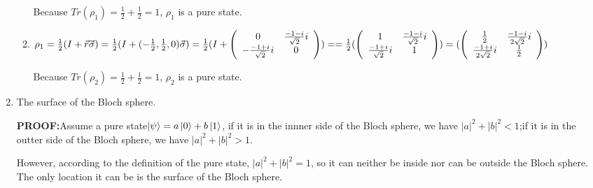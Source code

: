 \documentclass{article}
\begin{document}
\begin{enumerate}
\begin{enumerate}
                    Because $Tr(\rho_1)=\frac{1}{2}+\frac{1}{2}=1$, $\rho_1$ is a pure state.
              \item $\rho_1
                        \\=\frac{1}{2}(I+\vec{r}\vec{\sigma})
                        \\=\frac{1}{2}(I+(-\frac{1}{2},\frac{1}{2},0)\vec{\sigma})
                        \\=\frac{1}{2}(I+\left(
                        \begin{array}{cc}
                                0 & \frac{-1-i}{\sqrt{2}}i \\-\frac{-1+i}{\sqrt{2}}i&0\\
                            \end{array}
                        \right))
                        \\==\frac{1}{2}(\left(
                        \begin{array}{cc}
                                1 & \frac{-1-i}{\sqrt{2}}i \\\frac{-1+i}{\sqrt{2}}i&1\\
                            \end{array}
                        \right))
                        \\=(\left(
                        \begin{array}{cc}
                                \frac{1}{2} & \frac{-1-i}{2\sqrt{2}}i \\\frac{-1+i}{2\sqrt{2}}i&\frac{1}{2}\\
                            \end{array}
                        \right))
                    $

                    Because $Tr(\rho_2)=\frac{1}{2}+\frac{1}{2}=1$, $\rho_2$ is a pure state.
          \end{enumerate}
    \item The surface of the Bloch sphere.

          \textbf{PROOF:}Assume a pure state$\ket{\psi}=a\ket{0}+b\ket{1}$, if it is in the innner side of the Bloch sphere, we have $|a|^2+|b|^2<1$;if it is in the outter side of the Bloch sphere, we have $|a|^2+|b|^2>1$.

          However, according to the definition of the pure state, $|a|^2+|b|^2=1$, so it can neither be inside nor can be outside the Bloch sphere. The only location it can be is the surface of the Bloch sphere.




\end{enumerate}
\end{document}
